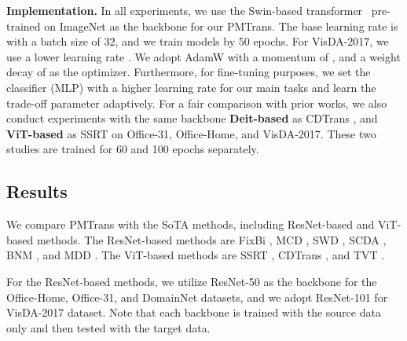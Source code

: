 \documentclass[10pt,twocolumn,letterpaper, ]{article}
\begin{document}
\noindent\textbf{Implementation.} In all experiments, we use the Swin-based transformer~\cite{Liu2021SwinTH}  pre-trained on ImageNet \cite{DengDSLL009} as the backbone for our PMTrans. The base learning rate is  with a batch size of 32, and we train models by 50 epochs. For VisDA-2017, we use a lower learning rate . We adopt AdamW \cite{LoshchilovH19} with a momentum of , and a weight decay of  as the optimizer. Furthermore, for fine-tuning purposes, we set the classifier (MLP) with a higher learning rate  for our main tasks and learn the trade-off parameter adaptively. For a fair comparison with prior works, we also conduct experiments with the same backbone \textbf{Deit-based} \cite{DBLP:journals/corr/abs-2012-12877} as CDTrans \cite{abs-2109-06165}, and \textbf{ViT-based} \cite{Dosovitskiy2021AnII} as SSRT \cite{abs-2204-07683} on Office-31, Office-Home, and VisDA-2017. These two studies are trained for 60 and 100 epochs separately. 




\subsection{Results}

We compare PMTrans with the SoTA methods, including ResNet-based and ViT-based methods. The ResNet-based methods are FixBi \cite{NaJCH21}, MCD \cite{SaitoWUH18}, SWD \cite{LeeBBU19}, SCDA \cite{0008XLLLQL21}, BNM \cite{CuiWZLH020}, and MDD \cite{0002LLJ19}. The ViT-based methods are SSRT \cite{abs-2204-07683}, CDTrans \cite{abs-2109-06165}, and TVT \cite{abs-2108-05988}. 

 For the ResNet-based methods, we utilize ResNet-50 as the backbone for the Office-Home, Office-31, and DomainNet datasets, and we adopt ResNet-101 for VisDA-2017 dataset. Note that each backbone is trained with the source data only and then tested with the target data. 
\end{document}
